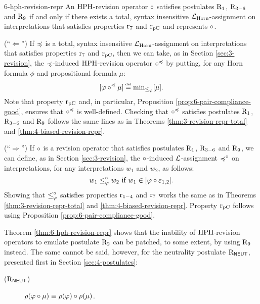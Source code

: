 \begin{thm}{}{6-hph-revision-repr}
	An ${\mathrm{HPH}}$-revision operator $\circ$ satisfies 
	postulates $\mathrm{R}_{1}$, $\mathrm{R}_{3-6}$ and $\mathrm{R}_{9}$
	if and only if there exists 
	a total, syntax insensitive $\mathcal{L}_{\mathrm{Horn}}$-assignment on interpretations
	that satisfies properties $\mathrm{r}_{7}$ and $\mathrm{r}_{\mathrm{pC}}$
	and represents $\circ$.
\end{thm}
\begin{prf*}{}{}%
	(``$\Leftarrow$'')	
	If $\preccurlyeq$ is a total, syntax insensitive $\mathcal{L}_{\mathrm{Horn}}$-assignment on interpretations
	that satisfies properties $\mathrm{r}_{7}$ and $\mathrm{r}_{\mathrm{pC}}$,
	then we can take, as in Section \ref{sec:3-revision},
	the $\preccurlyeq$-induced ${\mathrm{HPH}}$-revision operator $\circ^{\preccurlyeq}$ 
	by putting, for any Horn formula $\phi$ and propositional formula $\mu$:
	$$
		[\phi\re^{\as}\mu]\defeq\min_{\le_{\phi}}[\mu].
	$$
	Note that property $\mathrm{r}_{\mathrm{pC}}$ and, in particular, 
	Proposition \ref{prop:6-pair-compliance-good},
	ensures that $\circ^{\preccurlyeq}$ is well-defined.
	Checking that $\circ^{\preccurlyeq}$ satisfies postulates 
	$\mathrm{R}_{1}$, $\mathrm{R}_{3-6}$ and $\mathrm{R}_{9}$ follows the same 
	lines as in Theorems \ref{thm:3-revision-repr-total}
	and \ref{thm:4-biased-revision-repr}.

	(``$\Rightarrow$'')
	If $\circ$ is a revision operator that satisfies 
	postulates $\mathrm{R}_{1}$, $\mathrm{R}_{3-6}$ and $\mathrm{R}_{9}$,
	we can define, as in Section \ref{sec:3-revision}, 
	the $\circ$-induced $\mathcal{L}$-assignment $\preccurlyeq^{\circ}$ on interpretations,
	for any interpretations $w_1$ and $w_2$,
	as follows:
	$$
		w_1 \le^{\circ}_{\varphi} w_2~\text{if}~w_1\in[\varphi\circ \varepsilon_{1,2}].
	$$
	Showing that $\le^{\circ}_{\varphi}$ satisfies properties $\mathrm{r}_{1-4}$ and $\mathrm{r}_{7}$
	works the same as in Theorems \ref{thm:3-revision-repr-total}
	and \ref{thm:4-biased-revision-repr}.
	Property $\mathrm{r}_{\mathrm{pC}}$ follows using Proposition \ref{prop:6-pair-compliance-good}.
\end{prf*}

Theorem \ref{thm:6-hph-revision-repr} shows that 
the inability of ${\mathrm{HPH}}$-revision operators to emulate
postulate $\mathrm{R}_{2}$ can be patched, to some extent,
by using $\mathrm{R}_{9}$ instead.
The same cannot be said, however, for the neutrality postulate
$\mathrm{R}_{\mathsf{NEUT}}$, presented first in Section \ref{sec:4-postulates}:

\begin{description}
	\item[($\mathrm{R}_{\mathsf{NEUT}}$)] $\rho(\varphi\circ\mu)\equiv\rho(\varphi)\circ\rho(\mu)$.
\end{description}

